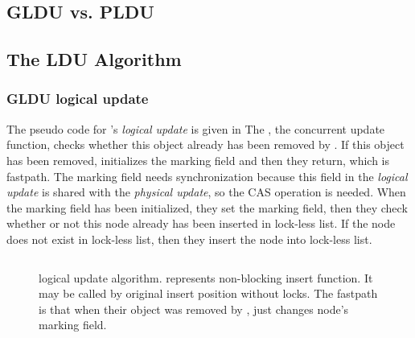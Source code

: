 \subsection{GLDU vs. PLDU}





\subsection{The LDU Algorithm}


\subsubsection{GLDU logical update}

The pseudo code for 's \emph{logical update} is given in
The , the concurrent update function, checks whether this
object already has been removed by .
If this object has been removed,  initializes the marking
 field and then they return, which is fastpath.
The marking field needs synchronization because this field in the
\emph{logical update} is shared with the \emph{physical update}, so the CAS
 operation is needed.
When the marking field has been initialized, they set the
marking field, then they check whether or not this node already has been
 inserted in lock-less list.
If the node does not exist in lock-less list, then they insert the node into
lock-less list.

\begin{figure}[tb!]
 
\inputminted[linenos,fontsize=\footnotesize, tabsize=2]{c}{src/ldu_logical.c}

\caption{ logical update algorithm.  represents
 non-blocking insert function.
It may be called by original insert position without locks. The fastpath is
 that when their object was removed by ,
  just changes node's marking field.}
\label{fig:gldulogicalupdate}
\end{figure}


